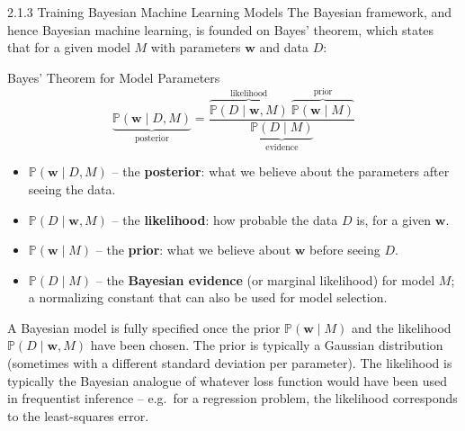 \documentclass[aspectratio=169,10pt]{beamer}
\begin{document}
\begin{frame}[allowframebreaks]{2.1.3 Training Bayesian Machine Learning Models}
  The Bayesian framework, and hence Bayesian machine learning, is founded on
  Bayes' theorem, which states that for a given model $M$ with parameters
  $\mathbf{w}$ and data $D$:

  \begin{block}{Bayes' Theorem for Model Parameters}
    \[
      \underbrace{\mathbb{P}(\mathbf{w}\mid D, M)}_{\text{posterior}}
      = \frac{\overbrace{\mathbb{P}(D\mid \mathbf{w}, M)}^{\text{likelihood}}\
              \overbrace{\mathbb{P}(\mathbf{w}\mid M)}^{\text{prior}}}
             {\underbrace{\mathbb{P}(D\mid M)}_{\text{evidence}}}
      \tag{2.1}
    \]
    \begin{itemize}
      \item $\mathbb{P}(\mathbf{w}\mid D,M)$ -- the \textbf{posterior}: what
        we believe about the parameters after seeing the data.
      \item $\mathbb{P}(D\mid \mathbf{w},M)$ -- the \textbf{likelihood}: how
        probable the data $D$ is, for a given $\mathbf{w}$.
      \item $\mathbb{P}(\mathbf{w}\mid M)$ -- the \textbf{prior}: what we
        believe about $\mathbf{w}$ before seeing $D$.
      \item $\mathbb{P}(D\mid M)$ -- the \textbf{Bayesian evidence} (or
        marginal likelihood) for model $M$; a normalizing constant that can
        also be used for model selection.
    \end{itemize}
  \end{block}

  A Bayesian model is fully specified once the prior $\mathbb{P}(\mathbf{w}\mid M)$
  and the likelihood $\mathbb{P}(D\mid \mathbf{w},M)$ have been chosen. The
  prior is typically a Gaussian distribution (sometimes with a different
  standard deviation per parameter). The likelihood is typically the
  Bayesian analogue of whatever loss function would have been used in
  frequentist inference -- e.g.\ for a regression problem, the likelihood
  corresponds to the least-squares error.

  \framebreak


\end{frame}
\end{document}
